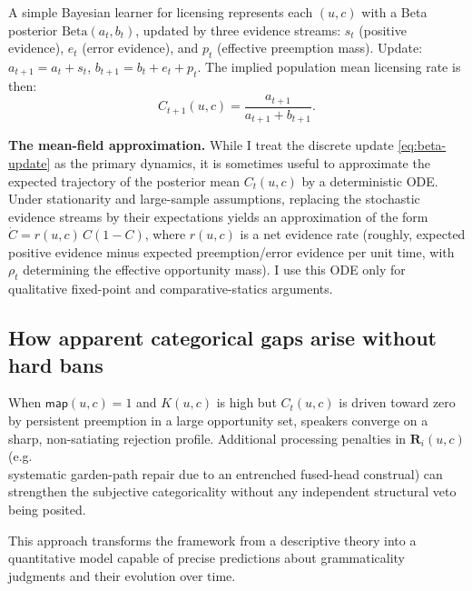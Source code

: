 \documentclass[12pt,letterpaper]{article}
\begin{document}
A simple Bayesian learner for licensing represents each $(u,c)$ with a Beta
posterior $\mathrm{Beta}(a_t,b_t)$, updated by three evidence streams:
$s_t$ (positive evidence), $e_t$ (error evidence), and $p_t$ (effective preemption mass).
Update: $a_{t+1}=a_t+s_t$, $b_{t+1}=b_t+e_t+p_t$.
The implied population mean licensing rate is then:
\begin{equation}\label{eq:beta-update}
C_{t+1}(u,c)=\frac{a_{t+1}}{a_{t+1}+b_{t+1}}.
\end{equation}

\begin{note}
\textbf{The mean-field approximation.} While I treat the discrete update \eqref{eq:beta-update} as the primary dynamics, it is sometimes useful to approximate the expected trajectory of the posterior mean $C_t(u,c)$ by a deterministic ODE. Under stationarity and large-sample assumptions, replacing the stochastic evidence streams by their expectations yields an approximation of the form $\dot{C}=r(u,c)\,C(1-C)$, where $r(u,c)$ is a net evidence rate (roughly, expected positive evidence minus expected preemption/error evidence per unit time, with $\rho_t$ determining the effective opportunity mass). I use this ODE only for qualitative fixed-point and comparative-statics arguments.
\end{note}


\subsection{How apparent categorical gaps arise without hard bans}
\label{sec:categorical-without-bans}

When $\mathsf{map}(u,c)=1$ and $K(u,c)$ is high but $C_t(u,c)$ is driven toward zero by
persistent preemption in a large opportunity set, speakers converge on a sharp,
non-satiating rejection profile.  Additional processing penalties in $\mathbf{R}_i(u,c)$
(e.g.\\ systematic garden-path repair due to an entrenched fused-head construal) can strengthen
the subjective categoricality without any independent structural veto being posited.

This approach transforms the framework from a descriptive theory into a quantitative model capable of precise predictions about grammaticality judgments and their evolution over time.


\end{document}
